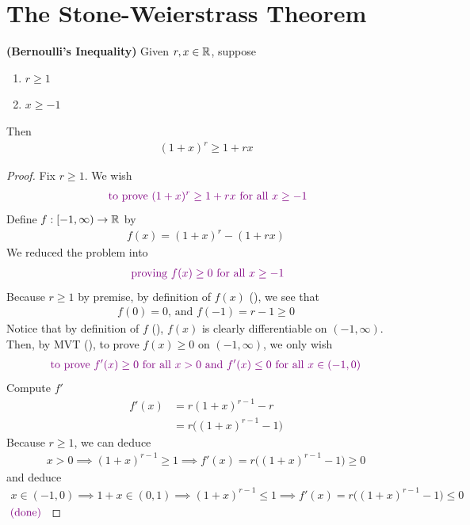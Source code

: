 \documentclass{report}
\begin{document}
\section{The Stone-Weierstrass Theorem}
\begin{theorem}
\label{Bernoulli's Inequality}
\textbf{(Bernoulli's Inequality)} Given $r,x \in\mathbb{R}$, suppose 
\begin{enumerate}[label=(\alph*)]
  \item $r\geq 1$ 
  \item $x\geq -1$
\end{enumerate}
Then
\begin{align*}
  (1+x)^r\geq 1+rx
\end{align*}
\end{theorem}
\begin{proof}
Fix $r\geq 1$. We wish 
\begin{align*}
\textcolor{violet}{\text{ to prove }(1+x)^r\geq 1+rx\text{ for all  }x \geq -1}
\end{align*}
Define $f:[-1,\infty)\rightarrow \mathbb{R}$ by 
 \begin{align}
\label{Bere1}
f(x)=(1+x)^r-(1+rx)
\end{align}
We reduced the problem into  
\begin{align*}
\textcolor{violet}{\text{ proving }f(x)\geq 0\text{ for all } x\geq -1}
\end{align*}
Because $r\geq 1$ by premise, by definition of $f(x)$  (), we see that 
\begin{align*}
f(0)=0\text{, and }f(-1)=r-1\geq 0
\end{align*}
Notice that by definition of $f$  (),  $f(x)$ is clearly differentiable on $(-1,\infty)$.\\

Then, by MVT (), to prove $f(x)\geq 0$ on $(-1,\infty)$, we only wish 
\begin{align*}
\textcolor{violet}{\text{ to prove }f'(x)\geq 0\text{ for all }x> 0\text{ and }f'(x)\leq 0\text{ for all $x \in (-1,0)$ }}
\end{align*}
Compute $f'$
 \begin{align*}
f'(x)&=r(1+x)^{r-1}-r\\
&=r\Big((1+x)^{r-1}-1 \Big)
\end{align*}
Because $r\geq 1$, we can deduce 
\begin{align*}
x>0 \implies (1+x)^{r-1}\geq 1 \implies f'(x)=r\Big((1+x)^{r-1}-1 \Big)\geq 0
\end{align*}
and deduce 
\begin{align*}
x \in (-1,0) \implies 1+x \in (0,1) \implies (1+x)^{r-1}\leq 1 \implies f'(x)=r\Big((1+x)^{r-1}-1 \Big)\leq  0
\end{align*}
$\textcolor{violet}{\text{ (done) }}$
\end{proof}
\end{document}
